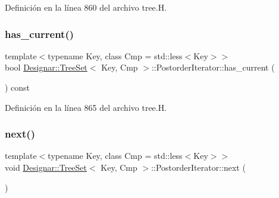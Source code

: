 Definición en la línea 860 del archivo tree.\+H.

\mbox{\label{class_designar_1_1_tree_set_1_1_postorder_iterator_a550cba5f162afa8ff251d750b6147f3c}} 
\subsubsection{\texorpdfstring{has\+\_\+current()}{has\_current()}}
{\footnotesize\ttfamily template$<$typename Key, class Cmp = std\+::less$<$\+Key$>$$>$ \\
bool \hyperlink{class_designar_1_1_tree_set}{Designar\+::\+Tree\+Set}$<$ Key, Cmp $>$\+::Postorder\+Iterator\+::has\+\_\+current (\begin{DoxyParamCaption}{ }\end{DoxyParamCaption}) const\hspace{0.3cm}{\ttfamily [inline]}}



Definición en la línea 865 del archivo tree.\+H.

\mbox{\label{class_designar_1_1_tree_set_1_1_postorder_iterator_a5dc00bc0f67733886839372bce6870e5}} 
\subsubsection{\texorpdfstring{next()}{next()}}
{\footnotesize\ttfamily template$<$typename Key, class Cmp = std\+::less$<$\+Key$>$$>$ \\
void \hyperlink{class_designar_1_1_tree_set}{Designar\+::\+Tree\+Set}$<$ Key, Cmp $>$\+::Postorder\+Iterator\+::next (\begin{DoxyParamCaption}{ }\end{DoxyParamCaption})\hspace{0.3cm}{\ttfamily [inline]}}



